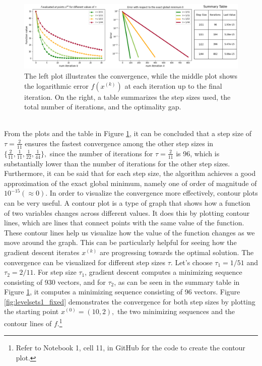 \begin{figure}[h!]
    \centering
        \includegraphics[width=1\textwidth]{Pictures/Merged_conv_ellipsoid_fixed_table.png}
    \caption{The left plot illustrates the convergence, while the middle plot shows the logarithmic error $f(x^{(k)})$ at each iteration up to the final iteration. On the right, a table summarizes the step sizes used, the total number of iterations, and the optimality gap.}\label{fig:convergence1_fixed}
\end{figure}\\
From the plots and the table in Figure \ref{fig:convergence1_fixed}, it can be concluded that a step size of $\tau=\frac{2}{11}$ ensures the fastest convergence among the other step sizes in $\{\frac{2}{11}, \frac{1}{11}, \frac{1}{22}, \frac{1}{44}\},$ since the number of iterations for $\tau=\frac{2}{11}$ is 96, which is substantially lower than the number of iterations for the other step sizes. Furthermore, it can be said that for each step size, the algorithm achieves a good approximation of the exact global minimum, namely one of order of magnitude of $10^{-15} (\approx 0).$   
\newpage
In order to visualize the convergence more effectively, contour plots can be very useful. A contour plot is a type of graph that shows how a function of two variables changes across different values. It does this by plotting contour lines, which are lines that connect points with the same value of the function. These contour lines help us visualize how the value of the function changes as we move around the graph. This can be particularly helpful for seeing how the gradient descent iterates $x^{(k)}$ are progressing towards the optimal solution.
The convergence can be visualized for different step sizes $\tau$. Let's choose $\tau_1 = 1/51$ and $\tau_2 = 2/11$. For step size $\tau_1$, gradient descent computes a minimizing sequence consisting of 930 vectors, and for $\tau_2$, as can be seen in the summary table in Figure \ref{fig:convergence1_fixed}, it computes a minimizing sequence consisting of 96 vectors. Figure \ref{fig:levelsets1_fixed} demonstrates the convergence for both step sizes by plotting the starting point $x^{(0)}=(10, 2),$ the two minimizing sequences and the contour lines of $f.$\footnote{Refer to Notebook 1, cell 11, in GitHub \cite{ThesisCode2023} for the code to create the contour plot.}
